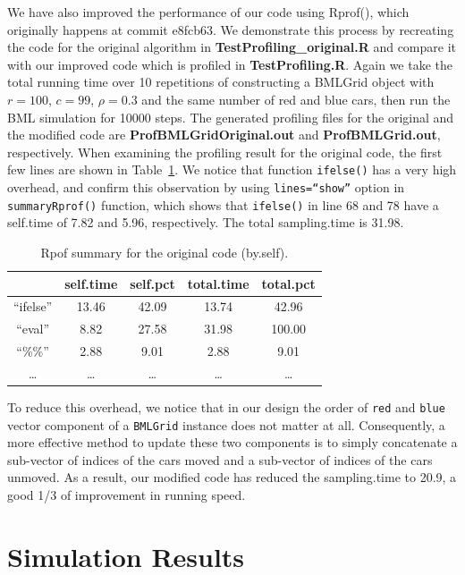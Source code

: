 \documentclass[twocolumn]{article}
\begin{document}
We have also improved the performance of our code using Rprof(), which
originally happens at commit e8fcb63. We demonstrate this process by recreating
the code for the original algorithm in \textbf{TestProfiling\_original.R} and
compare it with our improved code which is profiled in \textbf{TestProfiling.R}. Again
we take the total running time over 10 repetitions of constructing a BMLGrid
object with $r=100$, $c=99$, $\rho=0.3$ and the same number of red and blue
cars, then run the BML simulation for 10000 steps. The generated profiling files
for the original and the modified code are \textbf{ProfBMLGridOriginal.out} and
\textbf{ProfBMLGrid.out}, respectively. When examining the profiling result for
the original code, the first few lines are shown in Table~\ref{tab:profile_original}. We
notice that function \texttt{ifelse()} has a very high overhead, and confirm
this observation by using \texttt{lines=``show''} option in
\texttt{summaryRprof()} function, which shows that \texttt{ifelse()} in line 68
and 78 have a self.time of 7.82 and 5.96, respectively. The total sampling.time
is 31.98.

\begin{table}[!t]
    \renewcommand{\arraystretch}{1.3}
    \caption{Rpof summary for the original code (by.self).}
    \label{tab:profile_original}
    \centering
    \begin{tabular}{c|cccc}
        \hline
         & self.time & self.pct & total.time & total.pct \\
        \hline
        ``ifelse'' & 13.46 & 42.09 & 13.74 & 42.96 \\
        ``eval'' & 8.82 & 27.58 & 31.98 & 100.00 \\
        ``\%\%'' & 2.88 & 9.01 & 2.88 & 9.01 \\
        \ldots & \ldots & \ldots & \ldots & \ldots \\
        \hline
    \end{tabular}
\end{table}

To reduce this overhead, we notice that in our design the order of \texttt{red}
and \texttt{blue} vector component of a \texttt{BMLGrid} instance does not
matter at all. Consequently, a more effective method to update these two components is to
simply concatenate a sub-vector of indices of the cars moved and a
sub-vector of indices of the cars unmoved. As a result, our modified code has
reduced the sampling.time to 20.9, a good 1/3 of improvement in running speed.

\section{Simulation Results}
\end{document}
